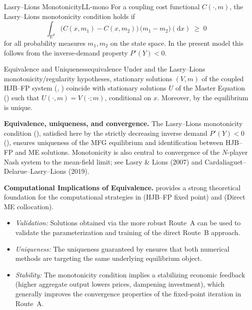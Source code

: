 \documentclass[11pt,letterpaper,oneside]{article}
\numberwithin{equation}{section}
\newcommand{\ac}[1]{{\mdseries\textsc{#1}}}
\newcommand{\1}{\mathbf{1}}
\begin{document}
\begin{definition}{Lasry--Lions Monotonicity}{LL-mono}
For a coupling cost functional $C(\cdot, m)$, the Lasry--Lions monotonicity condition holds if
\[
  \int_{\mathbb R^d} \bigl(C(x, m_1) - C(x, m_2)\bigr)\,\bigl(m_1 - m_2\bigr)(\mathrm dx) \;\ge\; 0
\]
for all probability measures $m_1, m_2$ on the state space. In the present model this follows from the inverse-demand property $P'(Y)<0$.
\end{definition}

\begin{theorem}{Equivalence and Uniqueness}{equivalence}
Under  and the Lasry--Lions monotonicity/regularity hypotheses, stationary solutions $(V,m)$ of the coupled \ac{HJB}--\ac{FP} system (, ) coincide with stationary solutions $U$ of the Master Equation () such that $U(\cdot, m) = V(\cdot; m)$, conditional on $x$. Moreover, by  the equilibrium is unique.
\end{theorem}

\begin{tcolorbox}[literaturestyle]
\textbf{Equivalence, uniqueness, and convergence.} The Lasry--Lions monotonicity condition (), satisfied here by the strictly decreasing inverse demand $P'(Y)<0$ (), ensures uniqueness of the MFG equilibrium and identification between HJB--FP and ME solutions. Monotonicity is also central to convergence of the $N$-player Nash system to the mean-field limit; see Lasry \& Lions (2007) and Cardaliaguet--Delarue--Lasry--Lions (2019).
\end{tcolorbox}

\begin{tcolorbox}[mathstyle]
\textbf{Computational Implications of Equivalence.}
 provides a strong theoretical foundation for the computational strategies in  (HJB--FP fixed point) and  (Direct ME collocation).
\begin{itemize}[leftmargin=1.15em,itemsep=0.25em]
\item \emph{Validation:} Solutions obtained via the more robust Route~A can be used to validate the parameterization and training of the direct Route~B approach.
\item \emph{Uniqueness:} The uniqueness guaranteed by  ensures that both numerical methods are targeting the same underlying equilibrium object.
\item \emph{Stability:} The monotonicity condition implies a stabilizing economic feedback (higher aggregate output lowers prices, dampening investment), which generally improves the convergence properties of the fixed-point iteration in Route~A.
\end{itemize}
\end{tcolorbox}
\end{document}
